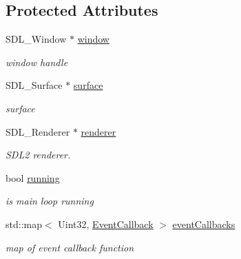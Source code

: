 \subsection*{Protected Attributes}
\begin{DoxyCompactItemize}
\item 
\mbox{\label{classWindow_ae39a7755a5a6ab74bcbdbe3e2e206820}} 
S\+D\+L\+\_\+\+Window $\ast$ \hyperlink{classWindow_ae39a7755a5a6ab74bcbdbe3e2e206820}{window}
\begin{DoxyCompactList}\small\item\em window handle \end{DoxyCompactList}\item 
\mbox{\label{classWindow_a1a42da4979d383bb3556f62df57952e5}} 
S\+D\+L\+\_\+\+Surface $\ast$ \hyperlink{classWindow_a1a42da4979d383bb3556f62df57952e5}{surface}
\begin{DoxyCompactList}\small\item\em surface \end{DoxyCompactList}\item 
\mbox{\label{classWindow_a2b52309ef359b6392454a3bb57398b5d}} 
S\+D\+L\+\_\+\+Renderer $\ast$ \hyperlink{classWindow_a2b52309ef359b6392454a3bb57398b5d}{renderer}
\begin{DoxyCompactList}\small\item\em S\+D\+L2 renderer. \end{DoxyCompactList}\item 
\mbox{\label{classWindow_a3a4074a228d183644d5bb379ceb137f6}} 
bool \hyperlink{classWindow_a3a4074a228d183644d5bb379ceb137f6}{running}
\begin{DoxyCompactList}\small\item\em is main loop running \end{DoxyCompactList}\item 
\mbox{\label{classWindow_ae109ff1ae7efd24eb863a87435c230b9}} 
std\+::map$<$ Uint32, \hyperlink{classWindow_a0e7a1332f3c35705eeed4d7b1a568d61}{Event\+Callback} $>$ \hyperlink{classWindow_ae109ff1ae7efd24eb863a87435c230b9}{event\+Callbacks}
\begin{DoxyCompactList}\small\item\em map of event callback function \end{DoxyCompactList}\item 

\end{DoxyCompactItemize}
